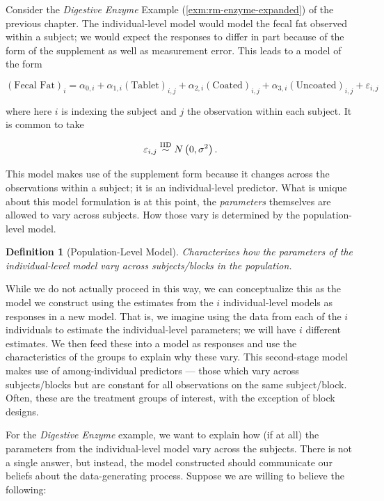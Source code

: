 \documentclass[
]{book}
\theoremstyle{plain}
\theoremstyle{mydefn}
\newtheorem{definition}{Definition}[chapter]
\theoremstyle{myexmpl}
\theoremstyle{remark}
\begin{document}
Consider the \emph{Digestive Enzyme} Example (\ref{exm:rm-enzyme-expanded}) of the previous chapter. The individual-level model would model the fecal fat observed within a subject; we would expect the responses to differ in part because of the form of the supplement as well as measurement error. This leads to a model of the form

\[(\text{Fecal Fat})_i = \alpha_{0,i} + \alpha_{1,i} (\text{Tablet})_{i,j} + \alpha_{2,i} (\text{Coated})_{i,j} + \alpha_{3,i} (\text{Uncoated})_{i,j} + \varepsilon_{i,j}\]

where here \(i\) is indexing the subject and \(j\) the observation within each subject. It is common to take

\[\varepsilon_{i,j} \stackrel{\text{IID}}{\sim} N\left(0, \sigma^2\right).\]

This model makes use of the supplement form because it changes across the observations within a subject; it is an individual-level predictor. What is unique about this model formulation is at this point, the \emph{parameters} themselves are allowed to vary across subjects. How those vary is determined by the population-level model.

\begin{definition}[Population-Level Model]
\protect\hypertarget{def:defn-population-model}{}{\label{def:defn-population-model} {} }Characterizes how the \emph{parameters} of the individual-level model vary across subjects/blocks in the population.
\end{definition}

While we do not actually proceed in this way, we can conceptualize this as the model we construct using the estimates from the \(i\) individual-level models as responses in a new model. That is, we imagine using the data from each of the \(i\) individuals to estimate the individual-level parameters; we will have \(i\) different estimates. We then feed these into a model as responses and use the characteristics of the groups to explain why these vary. This second-stage model makes use of among-individual predictors --- those which vary across subjects/blocks but are constant for all observations on the same subject/block. Often, these are the treatment groups of interest, with the exception of block designs.

For the \emph{Digestive Enzyme} example, we want to explain how (if at all) the parameters from the individual-level model vary across the subjects. There is not a single answer, but instead, the model constructed should communicate our beliefs about the data-generating process. Suppose we are willing to believe the following:
\end{document}
